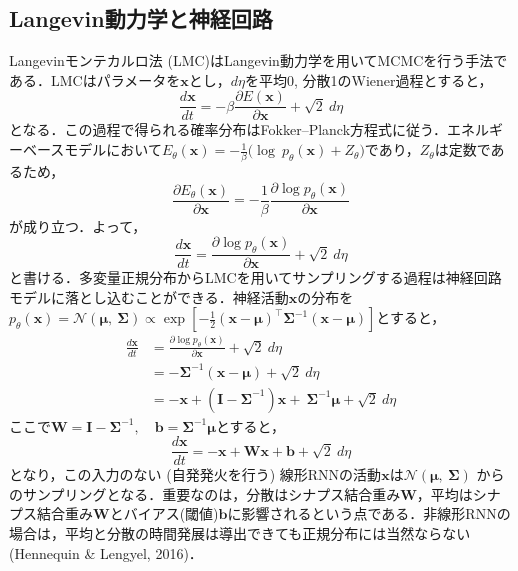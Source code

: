 \subsection{Langevin動力学と神経回路}
Langevinモンテカルロ法 (LMC)はLangevin動力学を用いてMCMCを行う手法である．LMCはパラメータを$\mathbf{x}$とし，$d\eta$を平均0, 分散1のWiener過程とすると，
\begin{equation}
\frac{d\mathbf{x}}{dt} = - \beta\frac{\partial E\left( \mathbf{x} \right)}{\partial\mathbf{x}} + \sqrt{2}\ d\eta
\end{equation}
となる．この過程で得られる確率分布はFokker–Planck方程式に従う．エネルギーベースモデルにおいて$E_{\theta}\left( \mathbf{x} \right) = - \frac{1}{\beta}(\log{\ p_{\theta}\left( \mathbf{x} \right) + Z_{\theta})}$であり，$Z_{\theta}$は定数であるため，
\begin{equation}
\frac{\partial E_{\theta}\left( \mathbf{x} \right)}{\partial\mathbf{x}} = - \frac{1}{\beta}\frac{\partial\log{p_{\theta}\left( \mathbf{x} \right)}}{\partial\mathbf{x}}
\end{equation}
が成り立つ．よって，
\begin{equation}
\frac{d\mathbf{x}}{dt} = \frac{\partial\log{p_{\theta}\left( \mathbf{x} \right)}}{\partial\mathbf{x}} + \sqrt{2}\ d\eta
\end{equation}
と書ける．多変量正規分布からLMCを用いてサンプリングする過程は神経回路モデルに落とし込むことができる．神経活動$\mathbf{x}$の分布を$p_{\theta}\left( \mathbf{x} \right) = \mathcal{N}\left( \mathbf{\mu},\ \mathbf{\Sigma} \right) \propto \exp\left\lbrack - \frac{1}{2}\left( \mathbf{x - \mu} \right)^{\top}\mathbf{\Sigma}^{- 1}\left( \mathbf{x - \mu} \right) \right\rbrack$とすると，
\begin{align}
\frac{d\mathbf{x}}{dt} &= \frac{\partial\log{p_{\theta}\left( \mathbf{x} \right)}}{\partial\mathbf{x}} + \sqrt{2}\ d\eta\\
&= - \mathbf{\Sigma}^{-1}\left( \mathbf{x - \mu} \right) + \sqrt{2}\ d\eta\\
&= - \mathbf{x}+\left( \mathbf{I - \Sigma}^{-1} \right)\mathbf{x} + \ \mathbf{\Sigma}^{-1}\mathbf{\mu} + \sqrt{2}\ d\eta
\end{align}
ここで$\mathbf{W} = \mathbf{I} -\mathbf{\Sigma}^{-1},\quad \mathbf{b} = \mathbf{\Sigma}^{-1}\mathbf{\mu}$とすると，
\begin{equation}
\frac{d\mathbf{x}}{dt} = - \mathbf{x} + \mathbf{Wx} + \mathbf{b} + \sqrt{2}\ d\eta
\end{equation}
となり，この入力のない (自発発火を行う) 線形RNNの活動$\mathbf{x}$は$\mathcal{N}(\mathbf{\mu},\ \mathbf{\Sigma})$ からのサンプリングとなる．重要なのは，分散はシナプス結合重み$\mathbf{W}$，平均はシナプス結合重み$\mathbf{W}$とバイアス(閾値)$\mathbf{b}$に影響されるという点である．非線形RNNの場合は，平均と分散の時間発展は導出できても正規分布には当然ならない (Hennequin & Lengyel, 2016)．
